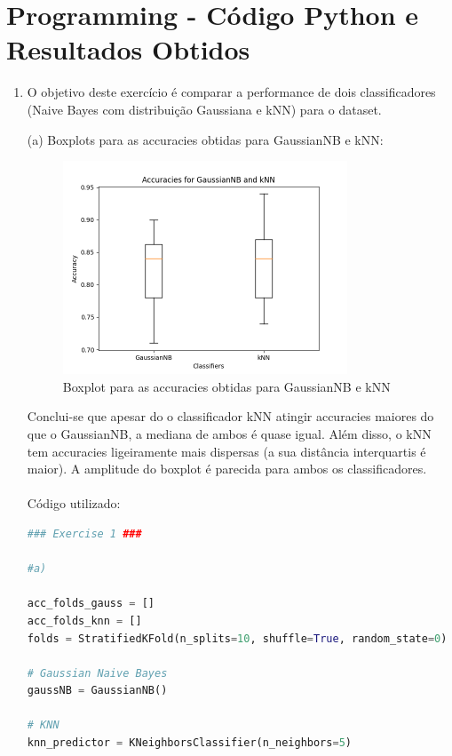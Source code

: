 \documentclass[a4paper,12pt]{article} %
\begin{document}
\clearpage
\section*{Programming - Código Python e Resultados Obtidos}

\begin{enumerate}
    \item O objetivo deste exercício é comparar a performance de dois classificadores
    (Naive Bayes com distribuição Gaussiana e kNN) para o dataset.
    
        (a) Boxplots para as accuracies obtidas para GaussianNB e kNN:
        \begin{figure}[H]
            \centering
            \includegraphics[width=0.8\textwidth]{ex1a_boxplot.png}
            \caption{Boxplot para as accuracies obtidas para GaussianNB e kNN}
            \label{fig:boxplot}
        \end{figure}
        Conclui-se que apesar do o classificador kNN atingir accuracies maiores do que 
        o GaussianNB, a mediana de ambos é quase igual. Além disso, o kNN tem accuracies ligeiramente mais dispersas 
        (a sua distância interquartis é maior). A amplitude do boxplot é parecida para ambos os classificadores. 
        \\ \\
        Código utilizado:
        \begin{lstlisting}[language=Python]
### Exercise 1 ###

#a)

acc_folds_gauss = []
acc_folds_knn = []
folds = StratifiedKFold(n_splits=10, shuffle=True, random_state=0)

# Gaussian Naive Bayes
gaussNB = GaussianNB()

# KNN
knn_predictor = KNeighborsClassifier(n_neighbors=5)


\end{lstlisting}
\end{enumerate}
\end{document}
